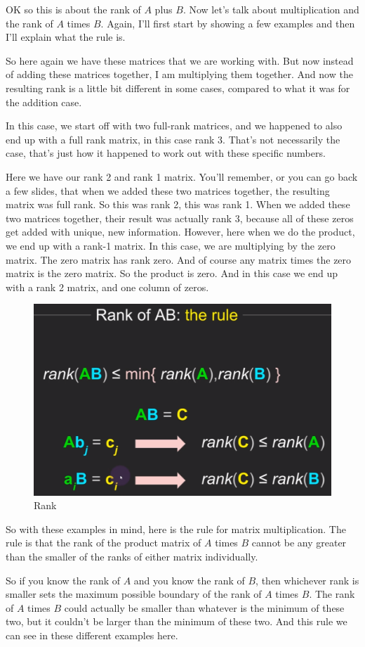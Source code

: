 \documentclass[fleqn,10pt]{olplainarticle}
\theoremstyle{definition}
\theoremstyle{remark}
\begin{document}
OK so this is about the rank of $A$ plus $B$. Now let's talk about multiplication and the rank of $A$ times $B$. Again, I'll first start by showing a few examples and then I'll explain what the rule is.

So here again we have these matrices that we are working with. But now instead of adding these matrices together, I am multiplying them together. And now the resulting rank is a little bit different in some cases, compared to what it was for the addition case.

In this case, we start off with two full-rank matrices, and we happened to also end up with a full rank matrix, in this case rank 3. That's not necessarily the case, that's just how it happened to work out with these specific numbers.

Here we have our rank 2 and rank 1 matrix. You'll remember, or you can go back a few slides, that when we added these two matrices together, the resulting matrix was full rank. So this was rank 2, this was rank 1. When we added these two matrices together, their result was actually rank 3, because all of these zeros get added with unique, new information. However, here when we do the product, we end up with a rank-1 matrix. In this case, we are multiplying by the zero matrix. The zero matrix has rank zero. And of course any matrix times the zero matrix is the zero matrix. So the product is zero. And in this case we end up with a rank 2 matrix, and one column of zeros.

\begin{figure}[ht]
	\centering
	\includegraphics[width=0.5\linewidth]{images/rank-21.png}
	\caption{Rank}
	\label{fig:rank_21}
\end{figure}

So with these examples in mind, here is the rule for matrix multiplication. The rule is that the rank of the product matrix of $A$ times $B$ cannot be any greater than the smaller of the ranks of either matrix individually.

So if you know the rank of $A$ and you know the rank of $B$, then whichever rank is smaller sets the maximum possible boundary of the rank of $A$ times $B$. The rank of $A$ times $B$ could actually be smaller than whatever is the minimum of these two, but it couldn't be larger than the minimum of these two. And this rule we can see in these different examples here.
\end{document}
